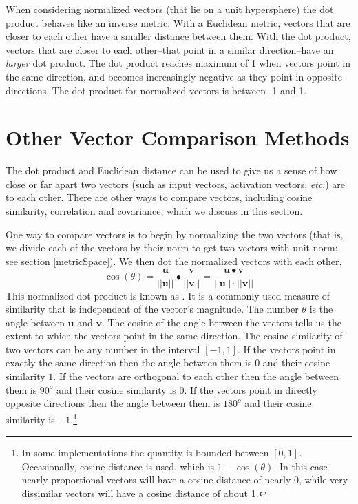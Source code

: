 When considering normalized vectors (that lie on a unit hypersphere) the dot product behaves like an inverse metric. With a Euclidean metric, vectors that are closer to each other have a smaller distance between them. With the dot product, vectors that are closer to each other--that point in a similar direction--have an \emph{larger} dot product. The dot product reaches maximum of 1 when vectors point in the same direction, and becomes increasingly negative as they point in opposite directions. The dot product for normalized vectors is between -1 and 1.

\section{Other Vector Comparison Methods}\label{vector_comparisons}

The dot product and Euclidean distance can be used to give us a sense of
how close or far apart two vectors (such as input vectors, activation vectors, 
\emph{etc}.) are to each other. There are other ways to compare vectors, including cosine similarity,
correlation and covariance, which we discuss in this section.

   One way to compare vectors is to begin by normalizing the two vectors (that is, we divide each
of the vectors by their norm to get two vectors with unit norm; see 
section \ref{metricSpace}). We then dot the normalized vectors with each 
other.
\begin{equation}\label{E:cossim}
\cos(\theta) = 
\frac{\mathbf{u}}{|| \mathbf{u}||}  \bullet 
\frac{\mathbf{v}}{|| \mathbf{v}||} =
\frac{\mathbf{u} \bullet \mathbf{v}}{|| \mathbf{u}||  \cdot 
||\mathbf{v}||}
\end{equation}
This normalized dot product is known as . It is a 
commonly used measure of similarity that is independent of the vector's 
magnitude. The number $\theta$ is the angle between $\mathbf{u}$ and 
$\mathbf{v}$. The cosine of the angle between the vectors tells us the extent 
to which the vectors point in the same direction. The cosine similarity of two 
vectors can be any number in the interval $[-1, 1]$. If the vectors point in 
exactly the same direction then the angle between them is $0$ and their cosine 
similarity $1$. If the vectors are orthogonal to each other then the angle 
between them is $90^o$ and their cosine similarity is $0$. If the vectors 
point in directly opposite directions then the angle between them is $180^o$ 
and their cosine similarity is $-1$.\footnote{In some implementations the
quantity is bounded between $[0,1]$. Occasionally, cosine distance is used, 
which is $1 - \cos(\theta)$. In this case nearly proportional vectors 
will have a cosine distance of nearly 0, while very dissimilar vectors will 
have a cosine distance of about 1.}

